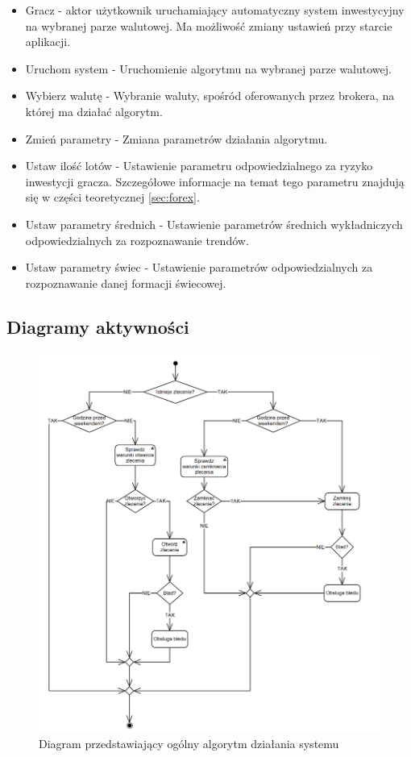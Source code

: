 \documentclass[pdflatex,11pt]{aghdpl}
\begin{document}
\begin{itemize}
\item
Gracz - aktor użytkownik uruchamiający automatyczny system inwestycyjny na wybranej parze walutowej. Ma możliwość zmiany ustawień przy starcie aplikacji. 
\item
Uruchom system - Uruchomienie algorytmu na wybranej parze walutowej.
\item
Wybierz walutę - Wybranie waluty, spośród oferowanych przez brokera, na której ma działać algorytm. 
\item
Zmień parametry - Zmiana parametrów działania algorytmu.
\item
Ustaw ilość lotów - Ustawienie parametru odpowiedzialnego za ryzyko inwestycji gracza. Szczegółowe informacje na temat tego parametru znajdują się w części teoretycznej \ref{sec:forex}.
\item
Ustaw parametry średnich - Ustawienie parametrów średnich wykładniczych odpowiedzialnych za rozpoznawanie trendów.
\item
Ustaw parametry świec - Ustawienie parametrów odpowiedzialnych za rozpoznawanie danej formacji świecowej.
\end{itemize}

\subsection{Diagramy aktywności}
\paragraph{}

\begin{figure}[H]
\begin{center}
\includegraphics[width=16cm]{ogolny.png}
\caption{Diagram przedstawiający ogólny algorytm działania systemu}
\label{ogolny}
\end{center}
\end{figure} 
\end{document}

